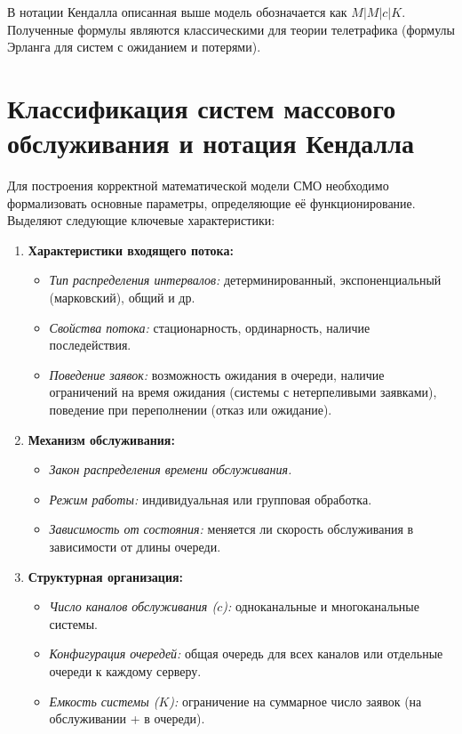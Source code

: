 \begin{note}
В нотации Кендалла описанная выше модель обозначается как \textbf{$M|M|c|K$}. Полученные формулы являются классическими для теории телетрафика (формулы Эрланга для систем с ожиданием и потерями).
\end{note}

\section{Классификация систем массового обслуживания и нотация Кендалла}

Для построения корректной математической модели СМО необходимо формализовать основные параметры, определяющие её функционирование. Выделяют следующие ключевые характеристики:

\begin{enumerate}
    \item \textbf{Характеристики входящего потока:}
    \begin{itemize}
        \item \textit{Тип распределения интервалов:} детерминированный, экспоненциальный (марковский), общий и др.
        \item \textit{Свойства потока:} стационарность, ординарность, наличие последействия.
        \item \textit{Поведение заявок:} возможность ожидания в очереди, наличие ограничений на время ожидания (системы с нетерпеливыми заявками), поведение при переполнении (отказ или ожидание).
    \end{itemize}
    
    \item \textbf{Механизм обслуживания:}
    \begin{itemize}
        \item \textit{Закон распределения времени обслуживания.}
        \item \textit{Режим работы:} индивидуальная или групповая обработка.
        \item \textit{Зависимость от состояния:} меняется ли скорость обслуживания в зависимости от длины очереди.
    \end{itemize}
    
    \item \textbf{Структурная организация:}
    \begin{itemize}
        \item \textit{Число каналов обслуживания ($c$):} одноканальные и многоканальные системы.
        \item \textit{Конфигурация очередей:} общая очередь для всех каналов или отдельные очереди к каждому серверу.
        \item \textit{Емкость системы ($K$):} ограничение на суммарное число заявок (на обслуживании + в очереди).
    \end{itemize}
    

\end{enumerate}
